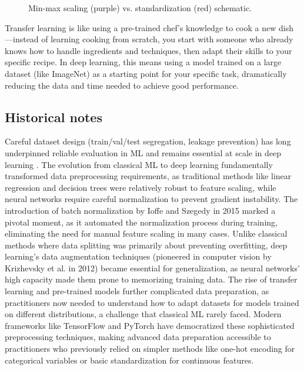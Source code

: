 \begin{figure}[ht]
  \centering
  \caption{Min-max scaling (purple) vs. standardization (red) schematic.}
  \label{fig:scaling}
\end{figure}

\begin{remark}
Transfer learning is like using a pre-trained chef's knowledge to cook a new dish—instead of learning cooking from scratch, you start with someone who already knows how to handle ingredients and techniques, then adapt their skills to your specific recipe. In deep learning, this means using a model trained on a large dataset (like ImageNet) as a starting point for your specific task, dramatically reducing the data and time needed to achieve good performance.
\end{remark}

\subsection{Historical notes}

Careful dataset design (train/val/test segregation, leakage prevention) has long underpinned reliable evaluation in ML and remains essential at scale in deep learning \textcite{Bishop2006,GoodfellowEtAl2016}. The evolution from classical ML to deep learning fundamentally transformed data preprocessing requirements, as traditional methods like linear regression and decision trees were relatively robust to feature scaling, while neural networks require careful normalization to prevent gradient instability. The introduction of batch normalization by Ioffe and Szegedy in 2015 marked a pivotal moment, as it automated the normalization process during training, eliminating the need for manual feature scaling in many cases. Unlike classical methods where data splitting was primarily about preventing overfitting, deep learning's data augmentation techniques (pioneered in computer vision by Krizhevsky et al. in 2012) became essential for generalization, as neural networks' high capacity made them prone to memorizing training data. The rise of transfer learning and pre-trained models further complicated data preparation, as practitioners now needed to understand how to adapt datasets for models trained on different distributions, a challenge that classical ML rarely faced. Modern frameworks like TensorFlow and PyTorch have democratized these sophisticated preprocessing techniques, making advanced data preparation accessible to practitioners who previously relied on simpler methods like one-hot encoding for categorical variables or basic standardization for continuous features.

